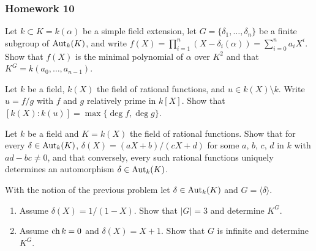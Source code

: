 \subsubsection{Homework 10}
\setcounter{exercise}{0}
\setcounter{equation}{0}

\begin{problem}
  Let \(k\subset K=k(\alpha)\) be a simple field extension, let
  \(G=\{\delta_1,\dotsc,\delta_n\}\) be a finite subgroup of \(\operatorname{Aut}_k(K)\),
  and write
  \(f(X)=\prod_{i=1}^n(X-\delta_i(\alpha))=\sum_{i=0}^na_iX^i\). Show that
  \(f(X)\) is the minimal polynomial of \(\alpha\) over \(K^2\) and that
  \(K^G=k(a_0,\dotsc,a_{n-1})\).
\end{problem}
\begin{solution}
\end{solution}

\begin{problem}
  Let \(k\) be a field, \(k(X)\) the field of rational functions, and
  \(u\in k(X)\setminus k\). Write \(u= f/g\) with \(f\) and \(g\)
  relatively prime in \(k[X]\). Show that
  \([k(X):k(u)]=\max\{{\deg f},{\deg g}\}\).
\end{problem}
\begin{solution}
\end{solution}

\begin{problem}
  Let \(k\) be a field and \(K= k(X)\) the field of rational
  functions. Show that for every \(\delta\in\operatorname{Aut}_k(K)\),
  \(\delta(X)= (aX+b)/(cX+d)\) for some \(a\), \(b\), \(c\), \(d\) in \(k\)
  with \(ad-bc\neq 0\), and that conversely, every such rational functions
  uniquely determines an automorphism \(\delta\in\operatorname{Aut}_k(K)\).
\end{problem}
\begin{solution}
\end{solution}

\begin{problem}
  With the notion of the previous problem let \(\delta\in\operatorname{Aut}_k(K)\) and
  \(G=\langle \delta \rangle\).
  \begin{enumerate}[label=(\alph*)]
  \item Assume \(\delta(X)=1/(1-X)\). Show that \(|G|=3\) and determine
    \(K^G\).
  \item Assume \(\operatorname{ch} k=0\) and \(\delta(X)=X+1\). Show that \(G\) is
    infinite and determine \(K^G\).
  \end{enumerate}
\end{problem}
\begin{solution}
\end{solution}

